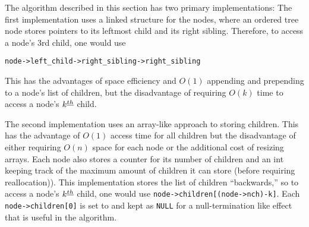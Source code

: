 The algorithm described in this section has two primary implementations: The first implementation uses a linked structure for the nodes, where an ordered tree node stores pointers to its leftmost child and its right sibling.  Therefore, to access a node's 3rd child, one would use 

\verb+node->left_child->right_sibling->right_sibling+ 

This has the advantages of space efficiency and $O(1)$ appending and prepending to a node's list of children, but the disadvantage of requiring $O(k)$ time to access a node's $k^{\underline{th}}$ child. 

The second implementation uses an array-like approach to storing children.  This has the advantage of $O(1)$ access time for all children but the disadvantage of either requiring $O(n)$ space for each node or the additional cost of resizing arrays.  Each node also stores a counter for its number of children and an int keeping track of the maximum amount of children it can store (before requiring reallocation)).  This implementation stores the list of children ``backwards,'' so to access a node's $k^{\underline{th}}$ child, one would use \verb+node->children[(node->nch)-k]+.  Each \verb+node->children[0]+ is set to and kept as \verb+NULL+ for a null-termination like effect that is useful in the algorithm.
